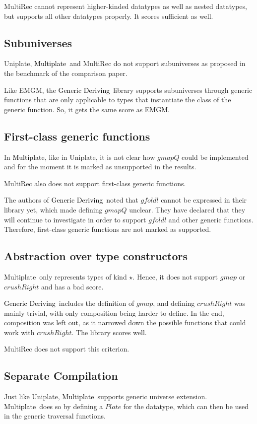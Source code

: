 \documentclass[twocolumn,11pt,a4paper]{article}
\newcommand{\multiplate}{\textcolor{black}{Multiplate}}
\newcommand{\genericderiving}{\textcolor{black}{Generic Deriving}}
\begin{document}
MultiRec cannot represent higher-kinded datatypes as well as nested datatypes, but supports all other datatypes properly.
It scores sufficient as well.

\subsection{Subuniverses}
Uniplate, \multiplate\ and MultiRec do not support subuniverses as proposed in the benchmark of the comparison paper.

Like EMGM, the \genericderiving\ library supports subuniverses through generic functions that are only applicable to types that instantiate the class of the generic function.
So, it gets the same score as EMGM.

\subsection{First-class generic functions}
In \multiplate, like in Uniplate, it is not clear how $ gmapQ $ could be implemented and for the moment it is marked as unsupported in the results.

MultiRec also does not support first-class generic functions.

The authors of \genericderiving\ noted that $ gfoldl $ cannot be expressed in their library yet, which made defining $ gmapQ $ unclear.
They have declared that they will continue to investigate in order to support $ gfoldl $ and other generic functions.
Therefore, first-class generic functions are not marked as supported.

\subsection{Abstraction over type constructors}
\multiplate\ only represents types of kind $ \star $.
Hence, it does not support $ gmap $ or $ crushRight $ and has a bad score.

\genericderiving\ includes the definition of $ gmap $, and defining  $ crushRight $ was mainly trivial, with only composition being harder to define.
In the end, composition was left out, as it narrowed down the possible functions that could work with $ crushRight $.
The library scores well.

MultiRec does not support this criterion.

\subsection{Separate Compilation}
Just like Uniplate, \multiplate\ supports generic universe extension.
\multiplate\ does so by defining a $ Plate $ for the datatype, which can then be used in the generic traversal functions.
\end{document}
